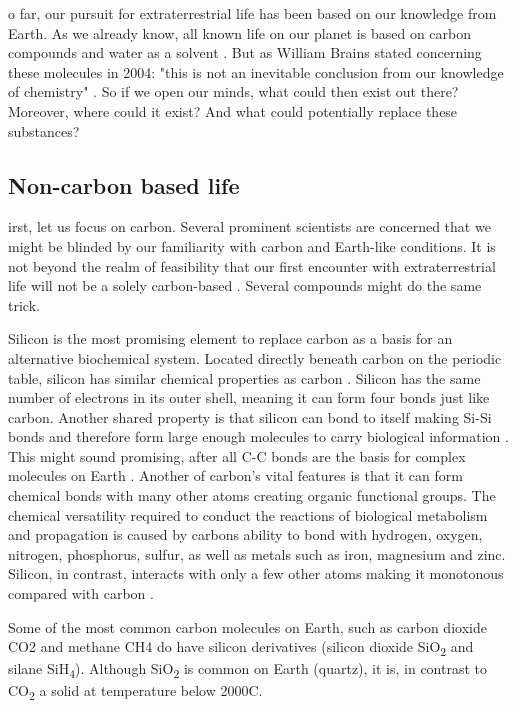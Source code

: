 o far, our pursuit for extraterrestrial life has been based on our knowledge from Earth.
As we already know, all known life on our planet is based on carbon compounds and water as a solvent \cite{OForm2}.
But as William Brains stated concerning these molecules in 2004: "this is not an inevitable conclusion from our knowledge of chemistry" \cite{OForm1}.
So if we open our minds, what could then exist out there?
Moreover, where could it exist?
And what could potentially replace these substances?

\subsection{Non-carbon based life}

irst, let us focus on carbon. Several prominent scientists are concerned that we might be blinded by our familiarity with carbon and Earth-like conditions.
It is not beyond the realm of feasibility that our first encounter with extraterrestrial life will not be a solely carbon-based \cite{OForm3}.
Several compounds might do the same trick.

Silicon is the most promising element to replace carbon as a basis for an alternative biochemical system. 
Located directly beneath carbon on the periodic table, silicon has similar chemical properties as carbon \cite{OForm4}.
Silicon has the same number of electrons in its outer shell, meaning it can form four bonds just like carbon.
Another shared property is that silicon can bond to itself making Si-Si bonds and therefore form large enough molecules to carry biological information \cite{OForm5}.
This might sound promising, after all C-C bonds are the basis for complex molecules on Earth \cite{OForm4}.
Another of carbon's vital features is that it can form chemical bonds with many other atoms creating organic functional groups.
The chemical versatility required to conduct the reactions of biological metabolism and propagation is caused by carbons ability to bond with hydrogen, oxygen, nitrogen, phosphorus, sulfur, as well as metals such as iron, magnesium and zinc.
Silicon, in contrast, interacts with only a few other atoms making it monotonous compared with carbon \cite{OForm5}.

Some of the most common carbon molecules on Earth, such as carbon dioxide CO2 and methane CH4 do have silicon derivatives (silicon dioxide SiO\textsubscript{2} and silane SiH\textsubscript{4}).
Although SiO\textsubscript{2} is common on Earth (quartz), it is, in contrast to CO\textsubscript{2} a solid at temperature below 2000\degree C.

